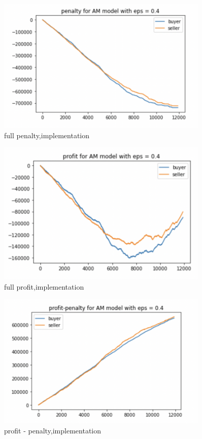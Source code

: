 \documentclass[11pt]{article}
\begin{document}
\begin{figure}[H]
	\begin{center}
	\includegraphics[width=0.9\textwidth]{40.PNG}
	\end{center}
	\caption{full penalty,implementation}
	\label{FIG.40}
\end{figure}

\begin{figure}[H]
	\begin{center}
	\includegraphics[width=0.9\textwidth]{41.PNG}
	\end{center}
	\caption{full profit,implementation}
	\label{FIG.41}
\end{figure}

\begin{figure}[H]
	\begin{center}
	\includegraphics[width=0.9\textwidth]{42.PNG}
	\end{center}
	\caption{profit - penalty,implementation}
	\label{FIG.42}
\end{figure}
\end{document}
